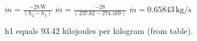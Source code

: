 \( \dot{m} = \frac{-28 \, \text{W}}{(h_2 - h_3)} \)  
\( \dot{m} = \frac{-28}{(237.62 - 274.169)} \)  
\( \dot{m} = 0.65843 \, \text{kg/s} \)

h1 equals 93.42 kilojoules per kilogram (from table).